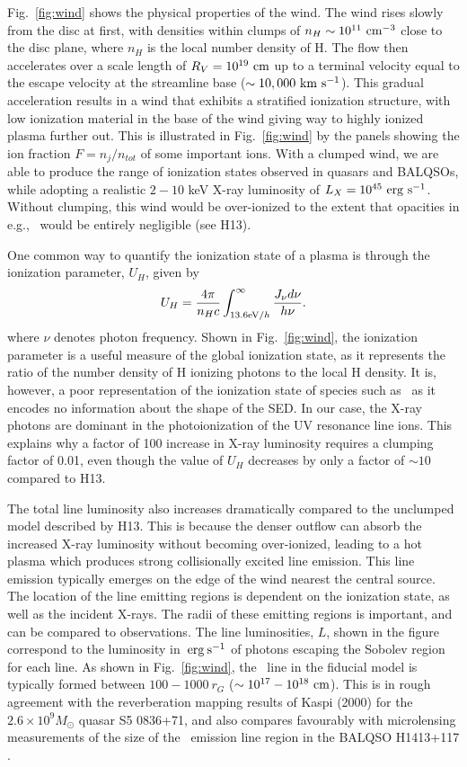 \documentclass[useAMS,usenatbib]{mn2e_x}
\begin{document}
\noindent
Fig.~\ref{fig:wind} shows the physical properties of the wind.
The wind rises slowly from the disc at first, with densities within clumps
of $n_H \sim 10^{11}~\rm{cm^{-3}}$ close to the disc plane, 
where $n_H$ is the local number density of H.
The flow then accelerates over a scale length of $R_V=10^{19}~\rm{cm}$
up to a terminal velocity equal to the escape velocity at the streamline base
($\sim10,000~\rm{km~s^{-1}}$). This gradual acceleration results in
a wind that exhibits a stratified ionization structure, with low ionization material
in the base of the wind giving way to highly ionized plasma further out.
This is illustrated in Fig.~\ref{fig:wind} 
by the panels showing the ion fraction $F=n_j/n_{tot}$ of some important ions.
With a clumped wind, we are able to produce the range of ionization states observed
in quasars and BALQSOs, while adopting a realistic $2-10$ keV X-ray luminosity
of $L_{X}=10^{45}~\rm{erg~s^{-1}}$. Without clumping, this wind would be over-ionized 
to the extent that opacities in e.g., \civ\ would be entirely negligible (see H13).

One common way to quantify the ionization state of a plasma
is through the ionization parameter, $U_H$, given by
\begin{equation}
U_H = \frac{4\pi}{n_H c}\int_{13.6{\rm{eV}} / h}^{\infty}\frac{{J_{\nu}d\nu}}{h\nu}.
\end{equation}
\noindent where $\nu$ denotes photon 
frequency. Shown in Fig.~\ref{fig:wind},
the ionization parameter is a useful measure of the global ionization state,
as it represents the ratio of the number density of 
H ionizing photons to the local H density.
It is, however, a poor representation of the 
ionization state of species such as \civ\ as it encodes no information
about the shape of the SED. In our case, the X-ray photons 
are dominant in the photoionization of the UV resonance line ions. 
This explains why a factor of 100 increase in X-ray luminosity requires
a clumping factor of 0.01, even though the value of $U_H$ decreases by only a factor of $\sim10$ compared to H13. 

The total line luminosity also increases dramatically compared to the unclumped model
described by H13. This is because the denser outflow can absorb the increased
X-ray luminosity without becoming over-ionized, leading to a hot plasma which
produces strong collisionally excited line emission.
This line emission typically emerges on the edge of the wind
nearest the central source. The location of the line emitting regions
is dependent on the ionization state, as well as the incident X-rays.
The radii of these emitting regions is important,
and can be compared to observations. The line luminosities, $L$,
shown in the figure correspond to the luminosity in $\:{\rm erg\:s^{-1}}$ of photons
escaping the Sobolev region for each line. 
As shown in Fig.~\ref{fig:wind},
the \civline\ line in the fiducial model is typically formed between 
$100-1000~r_G$ ($\sim10^{17}-10^{18}~\rm{cm}$).
This is in rough agreement with the reverberation mapping 
results of Kaspi (2000) for the $2.6\times10^{9} M_\odot$ quasar S5 0836+71,
and also compares favourably with microlensing measurements of the size of the
\civline\ emission line region in the BALQSO H1413+117 \citep{odowd2015}.
\end{document}
